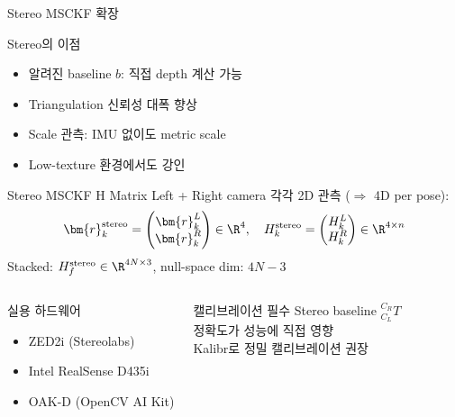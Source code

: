 \begin{frame}[shrink=10]{Stereo MSCKF 확장}
  \begin{block}{Stereo의 이점}
    \begin{itemize}
      \item 알려진 baseline $b$: 직접 depth 계산 가능
      \item Triangulation 신뢰성 대폭 향상
      \item Scale 관측: IMU 없이도 metric scale
      \item Low-texture 환경에서도 강인
    \end{itemize}
  \end{block}
  \begin{block}{Stereo MSCKF H Matrix}
    Left + Right camera 각각 2D 관측 ($\Rightarrow$ 4D per pose):
    \begin{align*}
      \bm{r}^{\text{stereo}}_{k} = \begin{pmatrix}\bm{r}^L_k \\ \bm{r}^R_k\end{pmatrix}
      \in \R^4, \quad
      H^{\text{stereo}}_k = \begin{pmatrix}H^L_k \\ H^R_k\end{pmatrix}
      \in \R^{4\times n}
    \end{align*}
    Stacked: $H_{f}^{\text{stereo}} \in \R^{4N\times 3}$, null-space dim: $4N-3$
  \end{block}
  \begin{columns}[T]
      \begin{exampleblock}{실용 하드웨어}
        \begin{itemize}
          \item ZED2i (Stereolabs)
          \item Intel RealSense D435i
          \item OAK-D (OpenCV AI Kit)
        \end{itemize}
      \end{exampleblock}
      \begin{alertblock}{캘리브레이션 필수}
        Stereo baseline ${}^{C_R}_{C_L}T$\\
        정확도가 성능에 직접 영향\\
        Kalibr로 정밀 캘리브레이션 권장
      \end{alertblock}
  \end{columns}
\end{frame}



